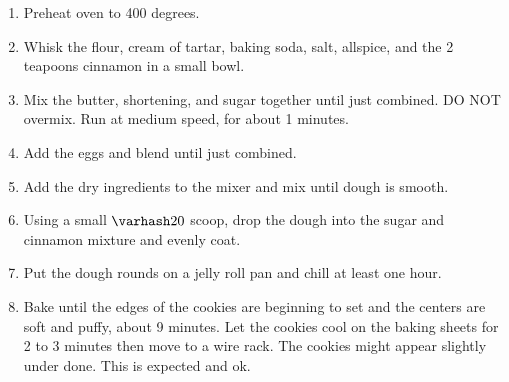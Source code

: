 \documentclass{article}
\begin{document}
\begin{enumerate}
    \item Preheat oven to 400 degrees.
    \item Whisk the flour, cream of tartar, baking soda, salt, allspice, and the 2 teapoons cinnamon
          in a small bowl.
    \item Mix the butter, shortening, and sugar together until just combined. DO NOT overmix. Run at
          medium speed, for about 1 minutes.
    \item Add the eggs and blend until just combined.
    \item Add the dry ingredients to the mixer and mix until dough is smooth.
    \item Using a small $\varhash 20$ scoop, drop the dough into the sugar and cinnamon mixture and
          evenly coat.
    \item Put the dough rounds on a jelly roll pan and chill at least one hour.
    \item Bake until the edges of the cookies are beginning to set and the centers are soft
          and puffy, about 9 minutes. Let the cookies cool on the baking sheets for 2 to 3
          minutes then move to a wire rack. The cookies might appear slightly under done. This
          is expected and ok.
\end{enumerate}

\medskip

\end{document}
